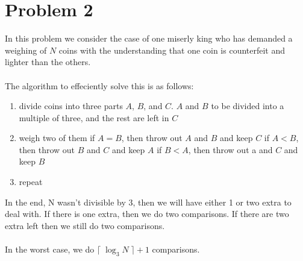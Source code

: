 \section*{Problem 2}

In this problem we consider the case of one miserly king who has 
demanded a weighing of $N$ coins with the understanding that one coin
is counterfeit and lighter than the others. 
\\
\\
The algorithm to effeciently solve this is as follows:
\begin{enumerate}[noitemsep]
    \item divide coins into three parts $A$, $B$, and $C$. $A$ and $B$
          to be divided into a multiple of three, and the rest are left
          in $C$ 
    \item weigh two of them
    \subitem if $A = B$,  then throw out $A$ and $B$ and keep $C$
    \subitem if $A < B$, then throw out $B$ and $C$ and keep $A$
    \subitem if $B < A$, then throw out a and $C$ and keep $B$
    \item repeat
\end{enumerate} 

In the end, N wasn't divisible by 3, then we will have either 1 or two 
extra to deal with. If there is one extra, then we do two comparisons. 
If there are two extra left then we still do two comparisons.
\\
\\
In the worst case, we do $\lceil \; \log_3 N \; \rceil + 1$ comparisons.
